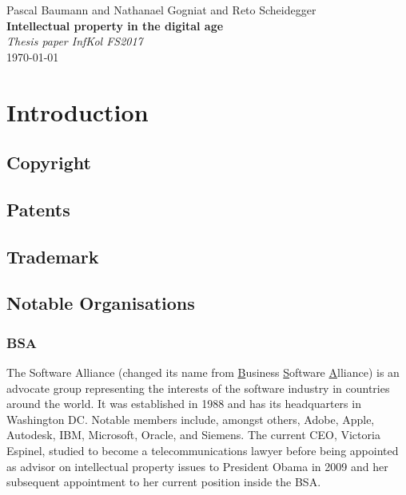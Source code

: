 \documentclass[a4paper]{report}
\newcommand*{\titleAP}{\begingroup %
	\centering
	\vspace*{\baselineskip} %
	
	{\Large Pascal Baumann} and {\Large Nathanael Gogniat} and {\Large Reto Scheidegger}\\[0.167\textheight] %
	
	{\Huge\bfseries Intellectual property in the digital age}\\[\baselineskip]
	
	{\Large \textit{Thesis paper InfKol FS2017}}\\
	\today
	
	\vspace*{3\baselineskip} %
	\endgroup}
\begin{document}
\titleAP

\begin{abstract}
	\blindtext
\end{abstract}
\newpage

\tableofcontents

\newpage

\chapter{Introduction}
\label{ch:Intro}

\section{Copyright}
\label{sec:Copyright}

\section{Patents}
\label{sec:Patents}

\section{Trademark}
\label{sec:Trademark}

\section{Notable Organisations}
\label{sec:Orgas}

\subsection{BSA}
\label{ssec:BSA}
The Software Alliance (changed its name from \underline{B}usiness \underline{S}oftware \underline{A}lliance) is an advocate group representing the interests of the software industry in countries around the world. It was established in 1988 and has its headquarters in Washington DC. Notable members include, amongst others, Adobe, Apple, Autodesk, IBM, Microsoft, Oracle, and Siemens. The current CEO, Victoria Espinel, studied to become a telecommunications lawyer before being appointed as advisor on intellectual property issues to President Obama in 2009 and her subsequent appointment to her current position inside the BSA. \parencite{Rogers2017}
\vspace{\baselineskip}
\end{document}
